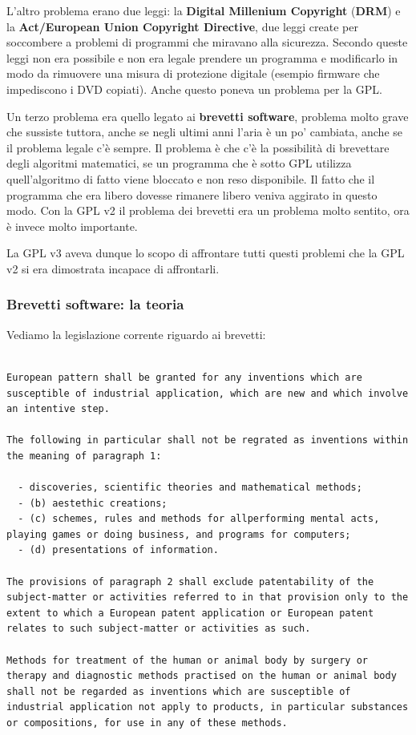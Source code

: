 L'altro problema erano due leggi: la \textbf{Digital Millenium Copyright} (\textbf{DRM}) e la \textbf{Act/European Union Copyright Directive}, due leggi create per soccombere a problemi di programmi che miravano alla sicurezza. Secondo queste leggi non era possibile e non era legale prendere un programma e modificarlo in modo da rimuovere una misura di protezione digitale (esempio firmware che impediscono i DVD copiati). Anche questo poneva un problema per la GPL.

Un terzo problema era quello legato ai \textbf{brevetti software}, problema molto grave che sussiste tuttora, anche se negli ultimi anni l'aria è un po' cambiata, anche se il problema legale c'è sempre. Il problema è che c'è la possibilità di brevettare degli algoritmi matematici, se un programma che è sotto GPL utilizza quell'algoritmo di fatto viene bloccato e non reso disponibile. Il fatto che il programma che era libero dovesse rimanere libero veniva aggirato in questo modo. Con la GPL v2 il problema dei brevetti era un problema molto sentito, ora è invece molto importante. 

La GPL v3 aveva dunque lo scopo di affrontare tutti questi problemi che la GPL v2 si era dimostrata incapace di affrontarli. 

\subsubsection{Brevetti software: la teoria}

Vediamo la legislazione corrente riguardo ai brevetti:

\begin{lstlisting}

European pattern shall be granted for any inventions which are susceptible of industrial application, which are new and which involve an intentive step.

The following in particular shall not be regrated as inventions within the meaning of paragraph 1:

  - discoveries, scientific theories and mathematical methods;
  - (b) aestethic creations;
  - (c) schemes, rules and methods for allperforming mental acts, playing games or doing business, and programs for computers;
  - (d) presentations of information.

The provisions of paragraph 2 shall exclude patentability of the subject-matter or activities referred to in that provision only to the extent to which a European patent application or European patent relates to such subject-matter or activities as such.

Methods for treatment of the human or animal body by surgery or therapy and diagnostic methods practised on the human or animal body shall not be regarded as inventions which are susceptible of industrial application not apply to products, in particular substances or compositions, for use in any of these methods.

\end{lstlisting}

